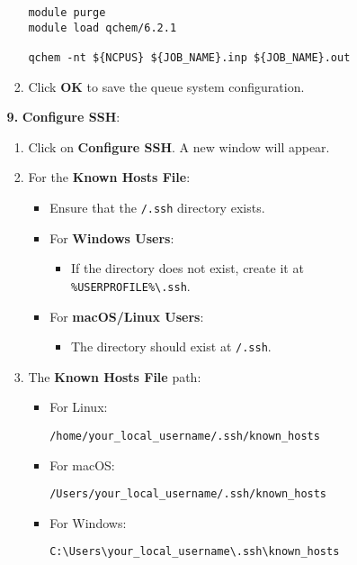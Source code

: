 \documentclass[12pt,letterpaper]{article}
\newcommand{\mytexttilde}{\raisebox{0.5ex}{\texttildelow}}
\begin{document}
\begin{enumerate}
\begin{enumerate}
\begin{enumerate}
\begin{lstlisting}[style=custombash]
module purge
module load qchem/6.2.1

qchem -nt ${NCPUS} ${JOB_NAME}.inp ${JOB_NAME}.out
            \end{lstlisting}

            \item Click \textbf{OK} to save the queue system configuration.
        \end{enumerate}
        \item[\textbf{9.}] \textbf{Configure SSH}:
        \begin{enumerate}
            \item Click on \textbf{Configure SSH}. A new window will appear.

            \item For the \textbf{Known Hosts File}:
            \begin{itemize}
                \item Ensure that the \texttt{\mytexttilde/.ssh} directory exists.
                \item For \textbf{Windows Users}:
                \begin{itemize}
                    \item If the directory does not exist, create it at \texttt{\%USERPROFILE\%\textbackslash.ssh}.
                \end{itemize}
                \item For \textbf{macOS/Linux Users}:
                \begin{itemize}
                    \item The directory should exist at \texttt{\mytexttilde/.ssh}.
                \end{itemize}
            \end{itemize}

            \item The \textbf{Known Hosts File} path:

            \begin{itemize}
                \item For Linux:
                \begin{lstlisting}[style=custombash]
/home/your_local_username/.ssh/known_hosts
                \end{lstlisting}
                \item For macOS:
                \begin{lstlisting}[style=custombash]
/Users/your_local_username/.ssh/known_hosts
                \end{lstlisting}
                \item For Windows:
                \begin{lstlisting}[style=custombash]
C:\Users\your_local_username\.ssh\known_hosts
                \end{lstlisting}
            \end{itemize}


\end{enumerate}
\end{enumerate}
\end{enumerate}
\end{document}

